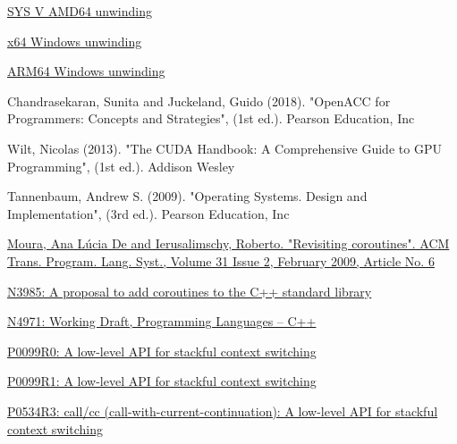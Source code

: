 \newpage
{}
\begin{thebibliography}{99}

        \href{https://software.intel.com/sites/default/files/article/402129/mpx-linux64-abi.pdf}{SYS V AMD64 unwinding}

        \href{https://docs.microsoft.com/en-us/cpp/build/exception-handling-x64?view=vs-2019}{x64 Windows unwinding}

        \href{https://docs.microsoft.com/en-us/cpp/build/arm64-exception-handling?view=vs-2019}{ARM64 Windows unwinding}

        {Chandrasekaran, Sunita and Juckeland, Guido (2018). "OpenACC for Programmers: Concepts and Strategies", (1st ed.).
         Pearson Education, Inc}

        {Wilt, Nicolas (2013). "The CUDA Handbook: A Comprehensive Guide to GPU Programming", (1st ed.).
         Addison Wesley}

        {Tannenbaum, Andrew S. (2009). "Operating Systems. Design and Implementation", (3rd ed.).
         Pearson Education, Inc}

        \href{http://www.inf.puc-rio.br/~roberto/docs/MCC15-04.pdf}
        {Moura, Ana L\'{u}cia De and Ierusalimschy, Roberto. "Revisiting coroutines".
         ACM Trans. Program. Lang. Syst., Volume 31 Issue 2, February 2009, Article No. 6}

        \href{http://isocpp.org/files/papers/n3985.pdf}
        {N3985: A proposal to add coroutines to the C++ standard library}

        \href{https://www.open-std.org/jtc1/sc22/wg21/docs/papers/2023/n4971.pdf}
        {N4971: Working Draft, Programming Languages -- C++}

        \href{http://www.open-std.org/jtc1/sc22/wg21/docs/papers/2015/p0099r0.pdf}
        {P0099R0: A low-level API for stackful context switching}

        \href{http://www.open-std.org/jtc1/sc22/wg21/docs/papers/2016/p0099r1.pdf}
        {P0099R1: A low-level API for stackful context switching}

        \href{http://www.open-std.org/jtc1/sc22/wg21/docs/papers/2017/p0534r3.pdf}
        {P0534R3: call/cc (call-with-current-continuation): A low-level API for stackful
        context switching}


\end{thebibliography}
